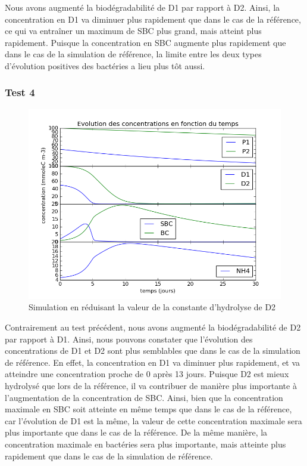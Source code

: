 \par{
Nous avons augment\'e la biod\'egradabilit\'e de D1 par rapport \`a D2. Ainsi, la concentration en D1 va diminuer plus rapidement que dans le cas de la r\'ef\'erence, ce qui va entra\^iner un maximum de SBC plus grand, mais atteint plus rapidement. Puisque la concentration en SBC augmente plus rapidement que dans le cas de la simulation de r\'ef\'erence, la limite entre les deux types d'\'evolution positives des bact\'eries a lieu plus t\^ot aussi.
}

\subsubsection{Test 4}

\par{
\begin{figure}[h!]
  \includegraphics[width=\textwidth]{partie2/Test4.png}
  \caption{Simulation en r\'eduisant la valeur de la constante d'hydrolyse de D2
  }
  \label{fig:partie2test4}
\end{figure}
}
\par{
Contrairement au test pr\'ec\'edent, nous avons augment\'e la biod\'egradabilit\'e de D2 par rapport \`a D1. Ainsi, nous pouvons constater que l'\'evolution des concentrations de D1 et D2 sont plus semblables que dans le cas de la simulation de r\'ef\'erence. En effet, la concentration en D1 va diminuer plus rapidement, et va atteindre une concentration proche de 0 apr\`es 13 jours. Puisque D2 est mieux hydrolys\'e que lors de la r\'ef\'erence, il va contribuer de mani\`ere plus importante \`a l'augmentation de la concentration de SBC. Ainsi, bien que la concentration maximale en SBC soit atteinte en m\^eme temps que dans le cas de la r\'ef\'erence, car l'\'evolution de D1 est la m\^eme, la valeur de cette concentration maximale sera plus importante que dans le cas de la r\'ef\'erence. De la m\^eme mani\`ere, la concentration maximale en bact\'eries sera plus importante, mais atteinte plus rapidement que dans le cas de la simulation de r\'ef\'erence.
}

